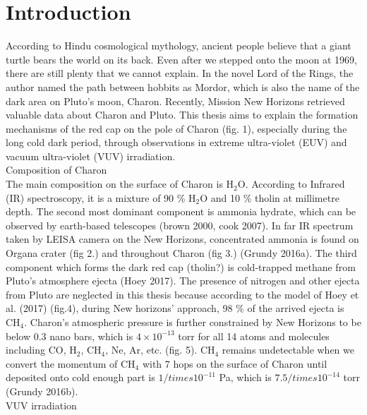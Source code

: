 \chapter{Introduction}


According to Hindu cosmological mythology, ancient people believe that a giant turtle bears the world on its back. Even after we stepped onto the moon at 1969, there are still plenty that we cannot explain. In the novel Lord of the Rings, the author named the path between hobbits as Mordor, which is also the name of the dark area on Pluto’s moon, Charon. Recently, Mission New Horizons retrieved valuable data about Charon and Pluto. This thesis aims to explain the formation mechanisms of the red cap on the pole of Charon (fig. 1), especially during the long cold dark period, through observations in extreme ultra-violet (EUV) and vacuum ultra-violet (VUV) irradiation.\\
Composition of Charon\\
The main composition on the surface of Charon is H$_2$O. According to Infrared (IR) spectroscopy, it is a mixture of 90 \% H$_2$O and 10 \% tholin at millimetre depth. The second most dominant component is ammonia hydrate, which can be observed by earth-based telescopes (brown 2000, cook 2007). In far IR spectrum taken by LEISA camera on the New Horizons, concentrated ammonia is found on Organa crater (fig 2.) and throughout Charon (fig 3.) (Grundy 2016a). The third component which forms the dark red cap (tholin?) is cold-trapped methane from Pluto’s atmosphere ejecta (Hoey 2017). The presence of nitrogen and other ejecta from Pluto are neglected in this thesis because according to the model of Hoey et al. (2017) (fig.4), during New horizons’ approach, 98 \% of the arrived ejecta is CH$_4$. Charon’s atmospheric pressure is further constrained by New Horizons to be below 0.3 nano bars, which is $4 \times 10^{-13}$ torr for all 14 atoms and molecules including CO, H$_2$, CH$_4$, Ne, Ar, etc. (fig. 5). CH$_4$ remains undetectable when we convert the momentum of CH$_4$ with 7 hops on the surface of Charon until deposited onto cold enough part is $1 /times 10^{-11}$ Pa, which is $7.5 /times 10^{-14}$ torr (Grundy 2016b).\\
VUV irradiation\\
